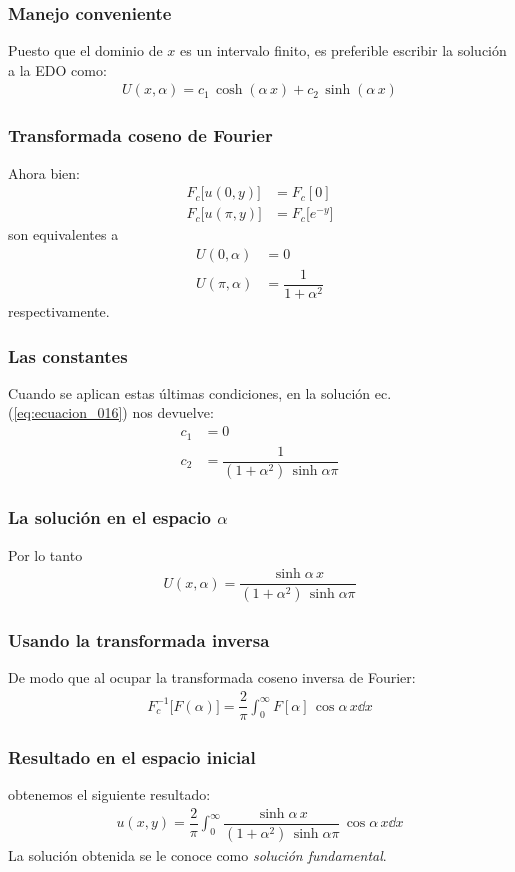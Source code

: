 \begin{frame}
\frametitle{Manejo conveniente}
Puesto que el dominio de $x$ es un intervalo finito, es preferible escribir la solución a la EDO como:
\begin{align}
U(x, \alpha) = c_{1} \, \cosh (\alpha \, x) + c_{2} \, \sinh (\alpha \, x)
\label{eq:ecuacion_016}
\end{align}
\end{frame}
\begin{frame}
\frametitle{Transformada coseno de Fourier}
Ahora bien:
\begin{align*}
F_{c} \big[ u(0, y)\big] &= F_{c} [0] \\[0.5em]
F_{c} \big[ u(\pi, y)\big] &= F_{c} \big[ e^{-y} \big]
\end{align*}
son equivalentes a
\begin{align*}
U(0, \alpha) &= 0 \\[0.5em]
U(\pi, \alpha) &= \dfrac{1}{1 +  \alpha^{2}}
\end{align*}
respectivamente.
\end{frame}
\begin{frame}
\frametitle{Las constantes}
Cuando se aplican estas últimas condiciones, en la solución ec. (\ref{eq:ecuacion_016}) nos devuelve:
\begin{align*}
c_{1} &= 0 \\[0.5em]
c_{2} &= \dfrac{1}{(1 + \alpha^{2}) \, \sinh \alpha \pi}
\end{align*}
\end{frame}
\begin{frame}
\frametitle{La solución en el espacio $\alpha$}
Por lo tanto
\begin{align*}
U(x, \alpha) = \dfrac{\sinh \alpha \, x}{(1 + \alpha^{2}) \, \sinh \alpha \pi}
\end{align*}
\end{frame}
\begin{frame}
\frametitle{Usando la transformada inversa}
De modo que al ocupar la transformada coseno inversa de Fourier:
\begin{align*}
F_{c}^{-1} \big[F(\alpha)\big] = \dfrac{2}{\pi} \int_{0}^{\infty} F[\alpha] \, \cos \alpha \, x \dd{x}
\end{align*}
\end{frame}
\begin{frame}
\frametitle{Resultado en el espacio inicial}
obtenemos el siguiente resultado:
\begin{align*}
u(x, y) = \dfrac{2}{\pi} \int_{0}^{\infty}  \dfrac{\sinh \alpha \, x}{(1 + \alpha^{2}) \, \sinh \alpha \pi} \, \cos \alpha \, x \dd{x}
\end{align*}
La solución obtenida se le conoce como \emph{solución fundamental}.
\end{frame}
